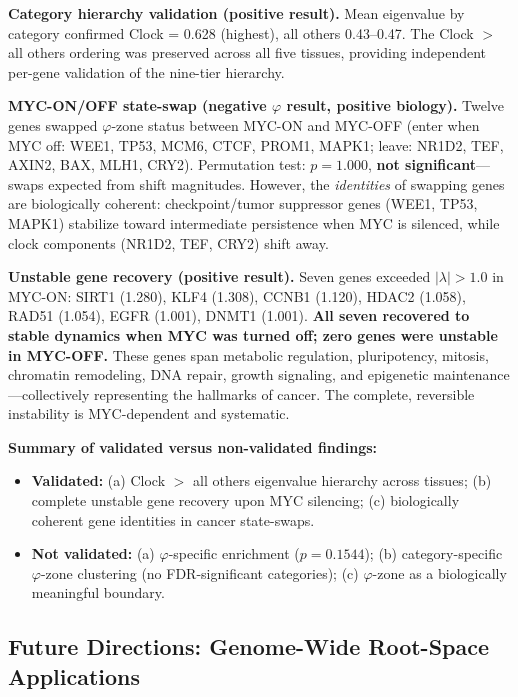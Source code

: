 \documentclass[11pt,a4paper]{article}
\begin{document}
\textbf{Category hierarchy validation (positive result).} Mean eigenvalue by category confirmed Clock = 0.628 (highest), all others 0.43--0.47. The Clock $>$ all others ordering was preserved across all five tissues, providing independent per-gene validation of the nine-tier hierarchy.

\textbf{MYC-ON/OFF state-swap (negative $\varphi$ result, positive biology).} Twelve genes swapped $\varphi$-zone status between MYC-ON and MYC-OFF (enter when MYC off: WEE1, TP53, MCM6, CTCF, PROM1, MAPK1; leave: NR1D2, TEF, AXIN2, BAX, MLH1, CRY2). Permutation test: $p = 1.000$, \textbf{not significant}---swaps expected from shift magnitudes. However, the \textit{identities} of swapping genes are biologically coherent: checkpoint/tumor suppressor genes (WEE1, TP53, MAPK1) stabilize toward intermediate persistence when MYC is silenced, while clock components (NR1D2, TEF, CRY2) shift away.

\textbf{Unstable gene recovery (positive result).} Seven genes exceeded $|\lambda| > 1.0$ in MYC-ON: SIRT1 (1.280), KLF4 (1.308), CCNB1 (1.120), HDAC2 (1.058), RAD51 (1.054), EGFR (1.001), DNMT1 (1.001). \textbf{All seven recovered to stable dynamics when MYC was turned off; zero genes were unstable in MYC-OFF.} These genes span metabolic regulation, pluripotency, mitosis, chromatin remodeling, DNA repair, growth signaling, and epigenetic maintenance---collectively representing the hallmarks of cancer. The complete, reversible instability is MYC-dependent and systematic.

\textbf{Summary of validated versus non-validated findings:}
\begin{itemize}[noitemsep]
    \item \textbf{Validated:} (a) Clock $>$ all others eigenvalue hierarchy across tissues; (b) complete unstable gene recovery upon MYC silencing; (c) biologically coherent gene identities in cancer state-swaps.
    \item \textbf{Not validated:} (a) $\varphi$-specific enrichment ($p = 0.1544$); (b) category-specific $\varphi$-zone clustering (no FDR-significant categories); (c) $\varphi$-zone as a biologically meaningful boundary.
\end{itemize}

\subsection*{Future Directions: Genome-Wide Root-Space Applications}
\end{document}
